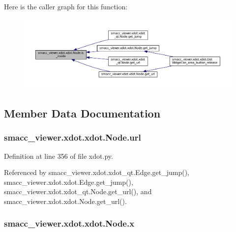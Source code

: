 Here is the caller graph for this function\+:
\nopagebreak
\begin{figure}[H]
\begin{center}
\leavevmode
\includegraphics[width=350pt]{classsmacc__viewer_1_1xdot_1_1xdot_1_1Node_a226e2f0e68d1bc9092a6c824359724d3_icgraph}
\end{center}
\end{figure}




\subsection{Member Data Documentation}
\subsubsection[{\texorpdfstring{url}{url}}]{\setlength{\rightskip}{0pt plus 5cm}smacc\+\_\+viewer.\+xdot.\+xdot.\+Node.\+url}\hypertarget{classsmacc__viewer_1_1xdot_1_1xdot_1_1Node_af3f695c93d9d48ba998635c34580b607}{}\label{classsmacc__viewer_1_1xdot_1_1xdot_1_1Node_af3f695c93d9d48ba998635c34580b607}


Definition at line 356 of file xdot.\+py.



Referenced by smacc\+\_\+viewer.\+xdot.\+xdot\+\_\+qt.\+Edge.\+get\+\_\+jump(), smacc\+\_\+viewer.\+xdot.\+xdot.\+Edge.\+get\+\_\+jump(), smacc\+\_\+viewer.\+xdot.\+xdot\+\_\+qt.\+Node.\+get\+\_\+url(), and smacc\+\_\+viewer.\+xdot.\+xdot.\+Node.\+get\+\_\+url().

\subsubsection[{\texorpdfstring{x}{x}}]{\setlength{\rightskip}{0pt plus 5cm}smacc\+\_\+viewer.\+xdot.\+xdot.\+Node.\+x}\hypertarget{classsmacc__viewer_1_1xdot_1_1xdot_1_1Node_a80b18bbe2fe72d1cd96ecf9a27f640d0}{}\label{classsmacc__viewer_1_1xdot_1_1xdot_1_1Node_a80b18bbe2fe72d1cd96ecf9a27f640d0}



